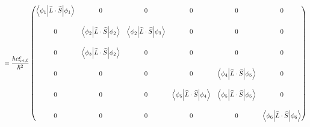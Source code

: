 \documentclass[11pt]{article}
\def\h{\hbar}
\def\l{\ell}
\def\la{\langle}
\def\ra{\rangle}
\newcommand{\Matrix}[1]{\begin{pmatrix} #1 \end{pmatrix}}
\renewcommand{\hat}{\widehat}
\theoremstyle{pink}
\theoremstyle{boxedsolution}
\theoremstyle{definition}
\theoremstyle{claim}
\begin{document}
\[=\frac{hc\xi_{n,\l}}{\h^2}
\Matrix{
\Big\la\phi_1\Big|\hat{L}\cdot\hat{S}\Big|\phi_1\Big\ra & 0 & 0 & 0 & 0 & 0\\
\vspace{1mm}
\\0 & \Big\la\phi_2\Big|\hat{L}\cdot\hat{S}\Big|\phi_2\Big\ra & \Big\la\phi_2\Big|\hat{L}\cdot\hat{S}\Big|\phi_3\Big\ra & 0 & 0 & 0\\
\vspace{1mm}
\\0 & \Big\la\phi_3\Big|\hat{L}\cdot\hat{S}\Big|\phi_2\Big\ra & 0 & 0 & 0 & 0\\
\vspace{1mm}
\\0 & 0 & 0 & 0 & \Big\la\phi_4\Big|\hat{L}\cdot\hat{S}\Big|\phi_5\Big\ra & 0\\
\vspace{1mm}
\\0 & 0 & 0 & \Big\la\phi_5\Big|\hat{L}\cdot\hat{S}\Big|\phi_4\Big\ra & \Big\la\phi_5\Big|\hat{L}\cdot\hat{S}\Big|\phi_5\Big\ra  & 0\\
\vspace{1mm}
\\0 & 0 & 0 & 0 & 0 & \Big\la\phi_6\Big|\hat{L}\cdot\hat{S}\Big|\phi_6\Big\ra}\]


\newpage
\end{document}
